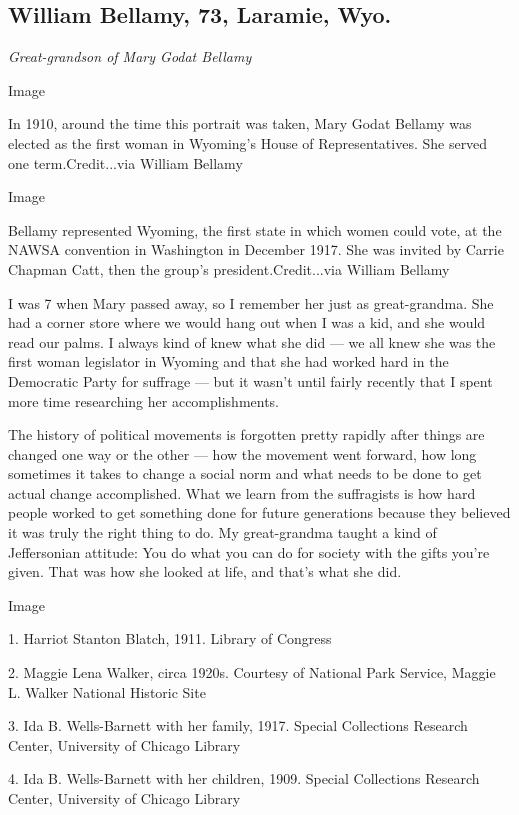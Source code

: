 \hypertarget{william-bellamy-73-laramie-wyo}{%
\subsection{William Bellamy, 73, Laramie,
Wyo.}\label{william-bellamy-73-laramie-wyo}}

\emph{Great-grandson of Mary Godat Bellamy}

Image

In 1910, around the time this portrait was taken, Mary Godat Bellamy was
elected as the first woman in Wyoming's House of Representatives. She
served one term.Credit...via William Bellamy

Image

Bellamy represented Wyoming, the first state in which women could vote,
at the NAWSA convention in Washington in December 1917. She was invited
by Carrie Chapman Catt, then the group's president.Credit...via William
Bellamy

I was 7 when Mary passed away, so I remember her just as great-grandma.
She had a corner store where we would hang out when I was a kid, and she
would read our palms. I always kind of knew what she did --- we all knew
she was the first woman legislator in Wyoming and that she had worked
hard in the Democratic Party for suffrage --- but it wasn't until fairly
recently that I spent more time researching her accomplishments.

The history of political movements is forgotten pretty rapidly after
things are changed one way or the other --- how the movement went
forward, how long sometimes it takes to change a social norm and what
needs to be done to get actual change accomplished. What we learn from
the suffragists is how hard people worked to get something done for
future generations because they believed it was truly the right thing to
do. My great-grandma taught a kind of Jeffersonian attitude: You do what
you can do for society with the gifts you're given. That was how she
looked at life, and that's what she did.

Image

1. Harriot Stanton Blatch, 1911. Library of Congress

2. Maggie Lena Walker, circa 1920s. Courtesy of National Park Service,
Maggie L. Walker National Historic Site

3. Ida B. Wells-Barnett with her family, 1917. Special Collections
Research Center, University of Chicago Library

4. Ida B. Wells-Barnett with her children, 1909. Special Collections
Research Center, University of Chicago Library

